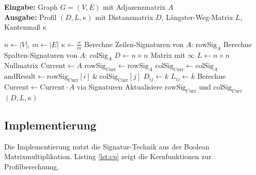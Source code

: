 ﻿\documentclass[a4paper,12pt]{article}
\theoremstyle{definition}
\begin{document}
	\begin{algorithm}[H]
		\caption{Vollständige Profilberechnung}
		\label{alg:profile}
		\textbf{Eingabe:} Graph $G = (V,E)$ mit Adjazenzmatrix $A$ \\
		\textbf{Ausgabe:} Profil $(D, L, \kappa)$ mit Distanzmatrix $D$, Längster-Weg-Matrix $L$, Kantenmaß $\kappa$
		\begin{algorithmic}[1]
			\State $n \gets |V|$, $m \gets |E|$
			\State $\kappa \gets \frac{n}{m}$ 
			\State Berechne Zeilen-Signaturen von $A$: $\text{rowSig}_A$ 
			\State Berechne Spalten-Signaturen von $A$: $\text{colSig}_A$ 
			\State $D \gets n \times n$ Matrix mit $\infty$
			\State $L \gets n \times n$ Nullmatrix
			\State $\text{Current} \gets A$
			\State $\text{rowSig}_{\text{Curr}} \gets \text{rowSig}_A$
			\State $\text{colSig}_{\text{Curr}} \gets \text{colSig}_A$
			\State $\text{andResult} \gets \text{rowSig}_{\text{Curr}}[i] \ \& \ \text{colSig}_{\text{Curr}}[j]$
			\State $D_{ij} \gets k$ 
			\EndIf
			\State $L_{ij} \gets k$ 
			\EndIf
			\EndFor
			\EndFor
			\State Berechne $\text{Current} \gets \text{Current} \cdot A$ via Signaturen
			\State Aktualisiere $\text{rowSig}_{\text{Curr}}$ und $\text{colSig}_{\text{Curr}}$
			\EndFor
			\State \Return $(D, L, \kappa)$
		\end{algorithmic}
	\end{algorithm}
	
	\subsection{Implementierung}
	
	Die Implementierung nutzt die Signatur-Technik aus der Boolean Matrixmultiplikation. Listing \ref{lst:cp} zeigt die Kernfunktionen zur Profilberechnung.
	
\end{document}
